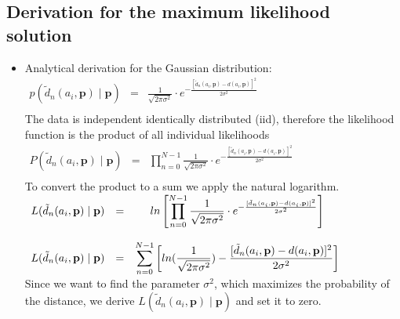 \documentclass{article}
\begin{document}
\subsection{Derivation for the maximum likelihood solution
}
\begin{itemize}

    \item Analytical derivation for the Gaussian distribution:\\
  
	    $\begin{array}{ccc}
	        p(\tilde{d}_n(a_i,\mathbf{p})\mid\mathbf{p}) & = & \frac{1}{\sqrt{2\pi\sigma^2}} \cdot e^{- \frac{[\tilde{d}_n(a_i,\mathbf{p})-d(a_i,\mathbf{p})]^2}{2\sigma^2}} \\  
	    \end{array}$\\
	    
	    The data is independent identically distributed (iid), therefore the likelihood function is the product of all individual likelihoods\\
	    
	    $\begin{array}{ccc}
	        P(\tilde{d}_n(a_i,\mathbf{p})\mid\mathbf{p}) & = & \displaystyle \prod_{n=0}^{N-1} \frac{1}{\sqrt{2\pi\sigma^2}} \cdot e^{- \frac{[\tilde{d}_n(a_i,\mathbf{p})-d(a_i,\mathbf{p})]^2}{2\sigma^2}} \\

	    \end{array}$\\
	  
	    To convert the product to a sum we apply the natural logarithm.\\
	  
	    $\begin{array}{cccl}
	        L(\tilde{d}_n(a_i,\mathbf{p})\mid\mathbf{p}) & = & ln \left[ \displaystyle \displaystyle \prod_{n=0}^{N-1} \frac{1}{\sqrt{2\pi\sigma^2}} \cdot e^{- \frac{[\tilde{d}_n(a_i,\mathbf{p})-d(a_i,\mathbf{p})]^2}{2\sigma^2}} \right] & \\\\
	        L(\tilde{d}_n(a_i,\mathbf{p})\mid\mathbf{p}) & = & \displaystyle \sum_{n=0}^{N-1} \left[ ln(\frac{1}{\sqrt{2\pi\sigma^2}}) - \frac{[\tilde{d}_n(a_i,\mathbf{p})-d(a_i,\mathbf{p})]^2}{2\sigma^2} \right] & \\
	    \end{array}$\\
	  
	    Since we want to find the parameter $\sigma^2$, which maximizes the probability of the distance, we derive $L(\tilde{d}_n(a_i,\mathbf{p})\mid\mathbf{p})$ and set it to zero. \\
	

\end{itemize}
\end{document}
